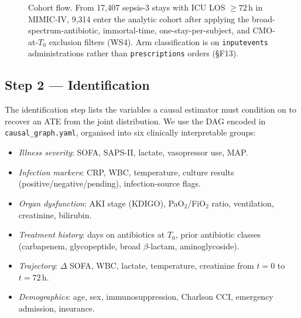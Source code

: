 \documentclass[11pt,a4paper]{article}
\begin{document}
\begin{figure}[H]
  \caption{Cohort flow. From 17{,}407 sepsis-3 stays with ICU LOS $\geq 72$\,h in MIMIC-IV, 9{,}314 enter the analytic cohort after applying the broad-spectrum-antibiotic, immortal-time, one-stay-per-subject, and CMO-at-$T_0$ exclusion filters (WS4). Arm classification is on \texttt{inputevents} administrations rather than \texttt{prescriptions} orders (\S F13).}
  \label{fig:cohort}
\end{figure}
\FloatBarrier

\subsection{Step 2 — Identification}
The identification step lists the variables a causal estimator must condition on to recover an ATE from the joint distribution. We use the DAG encoded in \texttt{causal\_graph.yaml}, organised into six clinically interpretable groups:

\begin{itemize}[leftmargin=*,itemsep=2pt]
\item \emph{Illness severity}: SOFA, SAPS-II, lactate, vasopressor use, MAP.
\item \emph{Infection markers}: CRP, WBC, temperature, culture results (positive/negative/pending), infection-source flags.
\item \emph{Organ dysfunction}: AKI stage (KDIGO), PaO$_2$/FiO$_2$ ratio, ventilation, creatinine, bilirubin.
\item \emph{Treatment history}: days on antibiotics at $T_0$, prior antibiotic classes (carbapenem, glycopeptide, broad $\beta$-lactam, aminoglycoside).
\item \emph{Trajectory}: $\Delta$ SOFA, WBC, lactate, temperature, creatinine from $t=0$ to $t=72$\,h.
\item \emph{Demographics}: age, sex, immunosuppression, Charlson CCI, emergency admission, insurance.
\end{itemize}
\end{document}

